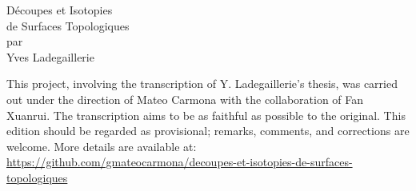 \documentclass[12pt,twoside]{report} %
\begin{document}
\setcounter{tocdepth}{2}
\sloppy


\thispagestyle{empty}
\noindent\makebox[\linewidth]{\rule{4in}{0.01in}}
\vspace*{\fill}
\begin{center}
    {\Huge Découpes et Isotopies} \\
    \vspace{0.5em}
    {\Huge de Surfaces Topologiques} \\
    \vspace{0.5em}
    {\Large par} \\
    \vspace{0.5em}
    {\huge Yves Ladegaillerie}
\end{center}
\vspace*{\fill}
\noindent\makebox[\linewidth]{\rule{4in}{0.01in}}

\newpage 
\thispagestyle{empty}

\null\vfill
\noindent\begin{minipage}{\textwidth}
This project, involving the transcription of Y. Ladegaillerie's thesis, was carried out under the direction of Mateo Carmona with the collaboration of Fan Xuanrui. The transcription aims to be as faithful as possible to the original. This edition should be regarded as provisional; remarks, comments, and corrections are welcome. More details are available at: \url{https://github.com/gmateocarmona/decoupes-et-isotopies-de-surfaces-topologiques}
\end{minipage}

\newpage
\end{document}
